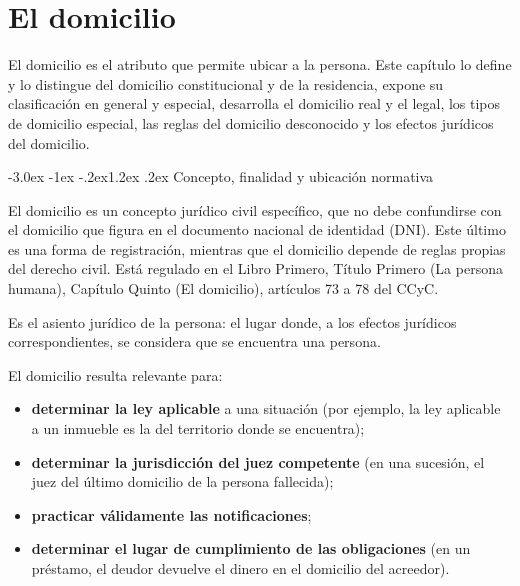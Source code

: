 \documentclass[12pt,oneside]{book}
\makeatletter
\renewcommand\section{\@startsection{section}{1}{\z@}%
  {-3.0ex \@plus -1ex \@minus -.2ex}{1.2ex \@plus .2ex}%
  {\normalfont\large\bfseries\color{acento}}}
\makeatother
\begin{document}

\chapter{El domicilio}
\label{cap:domicilio}

El domicilio es el atributo que permite ubicar a la persona. Este capítulo lo define y lo distingue del domicilio constitucional y de la residencia, expone su clasificación en general y especial, desarrolla el domicilio real y el legal, los tipos de domicilio especial, las reglas del domicilio desconocido y los efectos jurídicos del domicilio.

\section{Concepto, finalidad y ubicación normativa}

El domicilio es un concepto jurídico civil específico, que no debe confundirse con el domicilio que figura en el documento nacional de identidad (DNI). Este último es una forma de registración, mientras que el domicilio depende de reglas propias del derecho civil. Está regulado en el Libro Primero, Título Primero (La persona humana), Capítulo Quinto (El domicilio), artículos 73 a 78 del CCyC.

\begin{definicion}[Domicilio]
Es el asiento jurídico de la persona: el lugar donde, a los efectos jurídicos correspondientes, se considera que se encuentra una persona.
\end{definicion}

El domicilio resulta relevante para:

\begin{itemize}
\item \textbf{determinar la ley aplicable} a una situación (por ejemplo, la ley aplicable a un inmueble es la del territorio donde se encuentra);
\item \textbf{determinar la jurisdicción del juez competente} (en una sucesión, el juez del último domicilio de la persona fallecida);
\item \textbf{practicar válidamente las notificaciones};
\item \textbf{determinar el lugar de cumplimiento de las obligaciones} (en un préstamo, el deudor devuelve el dinero en el domicilio del acreedor).
\end{itemize}
\end{document}
